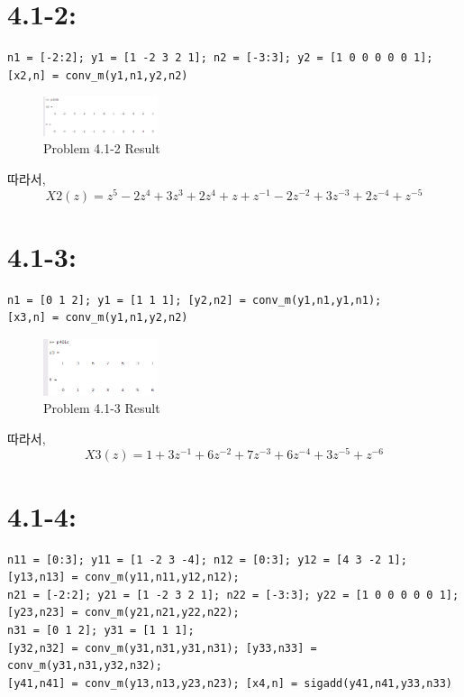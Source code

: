 \documentclass[11pt
  , a4paper
  , article
  , oneside
]{memoir}
\begin{document}
\clearpage
\section{4.1-2: }
\begin{lstlisting}[style=termstyle]
n1 = [-2:2]; y1 = [1 -2 3 2 1]; n2 = [-3:3]; y2 = [1 0 0 0 0 0 1];
[x2,n] = conv_m(y1,n1,y2,n2)
\end{lstlisting}

\begin{figure}[h!]
	\centering
	\includegraphics[width=0.3\textwidth,height=0.15\textwidth]{./images/p401-2.png}
	\caption{Problem 4.1-2 Result}
	\label{fig:Problem 4.1-2 Result}
\end{figure}
따라서, 
\begin {equation}
X2(z)=z^{5} - 2z^{4} + 3z^{3} + 2z^{4} + z + z^{-1} -2z^{-2} + 3z^{-3} + 2z^{-4}+ z^{-5}
\end {equation}
\section{4.1-3: }
\begin{lstlisting}[style=termstyle]
n1 = [0 1 2]; y1 = [1 1 1]; [y2,n2] = conv_m(y1,n1,y1,n1);
[x3,n] = conv_m(y1,n1,y2,n2)
\end{lstlisting}

\begin{figure}[h!]
	\centering
	\includegraphics[width=0.3\textwidth,height=0.15\textwidth]{./images/p401-3.png}
	\caption{Problem 4.1-3 Result}
	\label{fig:Problem 4.1-3 Result}
\end{figure}
따라서, 
\begin {equation}
X3(z)= 1 + 3z^{-1} + 6z^{-2} + 7z^{-3} + 6z^{-4} + 3z^{-5} + z^{-6}
\end {equation}
\clearpage
\section{4.1-4: }
\begin{lstlisting}[style=termstyle]
n11 = [0:3]; y11 = [1 -2 3 -4]; n12 = [0:3]; y12 = [4 3 -2 1];
[y13,n13] = conv_m(y11,n11,y12,n12);
n21 = [-2:2]; y21 = [1 -2 3 2 1]; n22 = [-3:3]; y22 = [1 0 0 0 0 0 1];
[y23,n23] = conv_m(y21,n21,y22,n22);
n31 = [0 1 2]; y31 = [1 1 1];
[y32,n32] = conv_m(y31,n31,y31,n31); [y33,n33] = conv_m(y31,n31,y32,n32);
[y41,n41] = conv_m(y13,n13,y23,n23); [x4,n] = sigadd(y41,n41,y33,n33)
\end{lstlisting}
\end{document}
